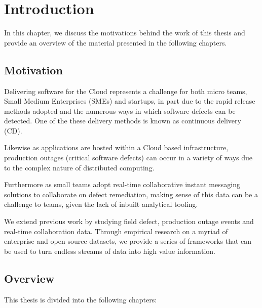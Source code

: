 

\chapter{Introduction}\label{ch:intro}

\begin{textsl}
{\small In this chapter, we discuss the motivations behind the work of this thesis and provide an overview
of the material presented in the following chapters.}
\end{textsl}

\vspace*{1cm}

\section{Motivation}

Delivering software for the Cloud represents a challenge for both micro teams, Small Medium Enterprises (SMEs) and startups, in part due to the rapid release methods adopted and the numerous ways in which software defects can be detected. One of the these delivery methods is known as continuous delivery (CD). 

Likewise as applications are hosted within a Cloud based infrastructure, production outages (critical software defects) can occur in a variety of ways due to the complex nature of distributed computing.

Furthermore as small teams adopt real-time collaborative instant messaging solutions to collaborate on defect remediation, making sense of this data can be a challenge to teams, given the lack of inbuilt analytical tooling.

We extend previous work by studying field defect, production outage events and real-time collaboration data. Through empirical research on a myriad of enterprise and open-source datasets, we provide a series of frameworks that can be used to turn endless streams of data into high value information.

\section{Overview}
This thesis is divided into the following chapters:

